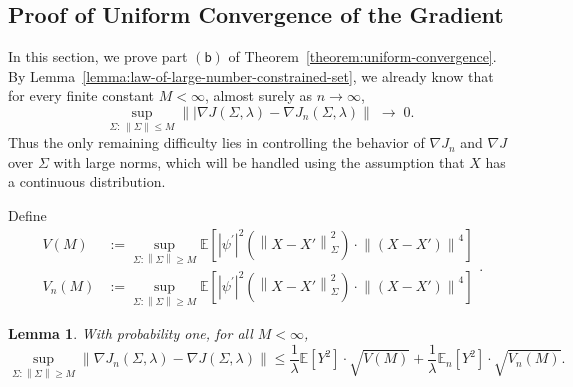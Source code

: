 \documentclass[sn-mathphys-num]{sn-jnl}%
\numberwithin{equation}{section}
\newcommand{\E}{\mathbb{E}}
\newcommand{\norm}[1]{\left\|{#1}\right\|} %
\newtheorem{lemma}{Lemma}
\newcommand{\grad}{\nabla}
\theoremstyle{thmstyleone}%
\theoremstyle{thmstyletwo}%
\theoremstyle{thmstylethree}%
\begin{document}
\subsection{Proof of Uniform Convergence of the Gradient}
\indent\indent
In this section, we prove part $\mathsf{(b)}$ of Theorem~\ref{theorem:uniform-convergence}.
By Lemma~\ref{lemma:law-of-large-number-constrained-set}, we already know that for every finite constant $M< \infty$, almost surely as $n \to \infty$, 
\begin{equation}
	\sup_{\Sigma:\,\|\Sigma\| \le M} 
	\norm{|\grad J(\Sigma, \lambda) - \grad J_n(\Sigma, \lambda)}
	\;\longrightarrow\; 0.
\end{equation}
Thus the only remaining difficulty lies in controlling the behavior of $\grad J_n$ and $\grad J$
over $\Sigma$ with large norms, which will be handled using the assumption that $X$ has a 
continuous distribution.

Define 
\begin{equation}	
\begin{split} 
	V(M) &:= \sup_{\Sigma: \norm{\Sigma} \ge M} \E[ |\psi^\prime|^2(\norm{X-X'}_\Sigma^2) \cdot \norm{(X-X')}^4]  \\
	V_n(M) &:= \sup_{\Sigma: \norm{\Sigma} \ge M} \E[ |\psi^\prime|^2(\norm{X-X'}_\Sigma^2) \cdot \norm{(X-X')}^4]
\end{split} .
\end{equation}

\vspace{.5em}
\begin{lemma}
\label{lemma:deterministic-bounds-V}
With probability one, for all $M < \infty$, 
\begin{equation*}
	\sup_{\Sigma: \norm{\Sigma} \ge M} \norm{\grad J_n(\Sigma, \lambda) - \grad J(\Sigma, \lambda)} \le 
		\frac{1}{\lambda} \E[Y^2] \cdot \sqrt{V(M)} + \frac{1}{\lambda} \E_n[Y^2] \cdot \sqrt{V_n(M)}.
\end{equation*}
\end{lemma} 


\end{document}
